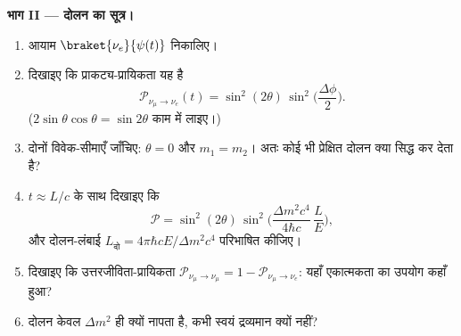 \begin{problem}[{सप्ताहांत समस्या --- पृथ्वी भर में द्वि-स्तरीय
दोलन}]
\medskip\noindent\textbf{भाग II --- दोलन का सूत्र।}
\begin{enumerate}[resume]
  \item आयाम $\braket{\nu_e}{\psi(t)}$ निकालिए।
  \item दिखाइए कि प्राकट्य-प्रायिकता यह है
        \[
        \mathcal P_{\nu_\mu \to \nu_e}(t) =
        \sin^2(2\theta)\,\sin^2\Big(\frac{\Delta\phi}{2}\Big) .
        \]
        ($2\sin\theta\cos\theta = \sin2\theta$ काम में लाइए।)
  \item दोनों विवेक-सीमाएँ जाँचिए: $\theta = 0$ और $m_1 = m_2$।
        अतः कोई भी प्रेक्षित दोलन क्या सिद्ध कर देता है?
  \item $t \approx L/c$ के साथ दिखाइए कि
        \[
        \mathcal P = \sin^2(2\theta)\,
        \sin^2\Big(\frac{\Delta m^2c^4}{4\hbar c}\,\frac{L}{E}\Big) ,
        \]
        और दोलन-लंबाई $L_{\text{दो}} =
        4\pi\hbar cE/\Delta m^2c^4$ परिभाषित कीजिए।
  \item दिखाइए कि उत्तरजीविता-प्रायिकता $\mathcal P_{\nu_\mu \to
        \nu_\mu} = 1 - \mathcal P_{\nu_\mu\to\nu_e}$: यहाँ
        एकात्मकता का उपयोग कहाँ हुआ?
  \item दोलन केवल $\Delta m^2$ ही क्यों नापता है, कभी स्वयं
        द्रव्यमान क्यों नहीं?
\end{enumerate}


\end{problem}
